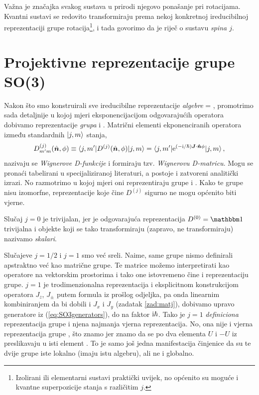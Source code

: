 Važna je značajka svakog sustava u prirodi 
njegovo ponašanje pri rotacijama. Kvantni sustavi se redovito
transformiraju prema nekoj konkretnoj ireducibilnoj reprezentaciji grupe
rotacija\footnote{Izolirani ili elementarni sustavi praktički uvijek, no
    općenito su moguće i kvantne superpozicije stanja s različitim $j$.}, i
 tada govorimo da je riječ o sustavu \emph{spina $j$}.


\section{Projektivne reprezentacije grupe SO(3)}
 \label{sec:projektivnerep}

Nakon što smo konstruirali sve ireducibilne reprezentacije \emph{algebre} 
 = , promotrimo sada detaljnije u kojoj mjeri eksponencijacijom
odgovarajućih operatora dobivamo reprezentacije \emph{grupa}  i .
Matrični elementi ekponenciranih operatora između standardnih
$| j, m \rangle$ stanja,
\begin{equation}
    D^{(j)}_{m'm}(\hat{\vec{n}},\phi)  \equiv  \bra{j,m'} D^{(j)}(\hat{\vec{n}},\phi) \ket{j, m} 
    =\bra{j,m'} \rme^{(-\rmi/\hbar)\vec{J}\cdot\unitn\phi}\ket{j, m} \,,
    \label{eq:WignerD}
\end{equation}
nazivaju se \emph{Wignerove D-funkcije} i formiraju tzv. \emph{Wignerovu D-matricu}.
Mogu se pronaći tabelirani u specijaliziranoj literaturi, a postoje
i zatvoreni analitički izrazi. No razmotrimo u kojoj mjeri oni
reprezentiraju grupe  i . Kako te grupe nisu izomorfne,
reprezentacije koje čine $D^{(j)}$ sigurno ne mogu općenito biti vjerne.

Slučaj $j=0$ je trivijalan, jer je odgovarajuća reprezentacija $D^{(0)}=\Eins$
trivijalna i objekte koji se tako transformiraju (zapravo, ne transformiraju)
nazivamo \emph{skalari}.

Slučajeve $j=1/2$ i $j=1$ smo već sreli. Naime, same grupe nismo definirali
apstraktno već kao matrične grupe. Te matrice možemo interpretirati kao operatore
na vektorskim prostorima i tako one istovremeno čine i reprezentaciju grupe.
$j=1$ je trodimenzionalna reprezentacija i eksplicitnom konstrukcijom
operatora $J_z$, $J_\pm$ putem formula iz prošlog odjeljka, pa onda linearnim
kombiniranjem da bi dobili i $J_x$ i $J_y$ (zadatak \ref{zad:matj}), 
dobivamo upravo generatore iz (\ref{eq:SO3generators}), do na faktor $\textrm{i}\hbar$.
Tako je $j=1$ \emph{definiciona} reprezentacija grupe  i njena najmanja
vjerna reprezentacija. 
No, ona nije i vjerna reprezentacija grupe , što znamo jer znamo da
se po dva elementa $U$ i $-U$ iz   preslikavaju u isti element 
. To je samo još jedna manifestacija činjenice da su te dvije grupe
iste lokalno (imaju istu algebru), ali ne i globalno.


